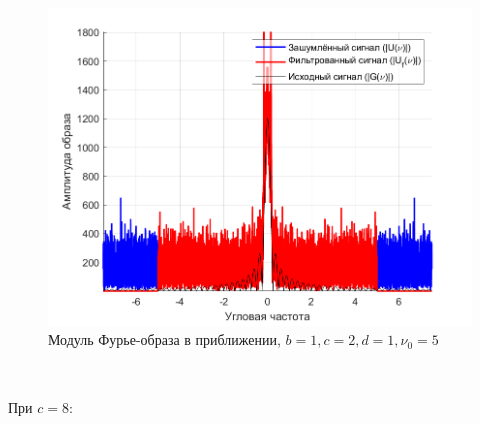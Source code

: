 \documentclass[a4paper]{article}
\begin{document}
\begin{figure}[H]
    \centering
    \includegraphics[width=0.5\linewidth]{part2/1_2_1_Fourier_scaled.png}
    \caption{Модуль Фурье-образа в приближении, $b = 1, c = 2, d = 1, \nu_0 = 5$}
\end{figure}\

При $c = 8$:
\end{document}
